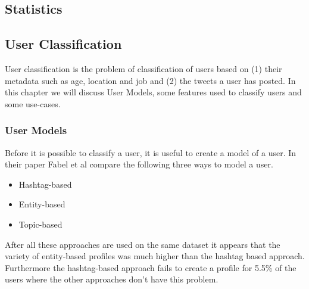 \documentclass{article}
\begin{document}
\subsection{Statistics}

\subsection{User Classification}
User classification is the problem of classification of users based on (1) their metadata such as age, location and job and (2) the tweets a user has posted. In this chapter we will discuss User Models, some features used to classify users and some use-cases. 
\subsubsection{User Models}
Before it is possible to classify a user, it is useful to create a model of a user. In their paper Fabel et al compare the following three ways to model a user. \cite{usermodel}
\begin{itemize}
\item Hashtag-based
\item Entity-based
\item Topic-based

\end{itemize}
After all these approaches are used on the same dataset it appears that the variety of entity-based profiles was much higher than the hashtag based approach. \cite{usermodel} Furthermore the hashtag-based approach fails to create a profile for 5.5\% of the users where the other approaches don't have this problem.  
\end{document}
